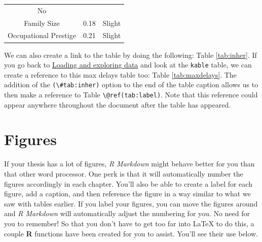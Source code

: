 \documentclass[12pt,twoside]{dukestatscithesis}
\theoremstyle{definition}
\theoremstyle{definition}
\theoremstyle{definition}
\theoremstyle{remark}
\begin{document}
\begin{longtable}[]{@{}ccc@{}}
\begin{minipage}[t]{0.16\columnwidth}
No\strut
\end{minipage}\tabularnewline
\begin{minipage}[t]{0.29\columnwidth}\centering\strut
Family Size\strut
\end{minipage} & \begin{minipage}[t]{0.47\columnwidth}\centering\strut
0.18\strut
\end{minipage} & \begin{minipage}[t]{0.16\columnwidth}\centering\strut
Slight\strut
\end{minipage}\tabularnewline
\begin{minipage}[t]{0.29\columnwidth}\centering\strut
Occupational Prestige\strut
\end{minipage} & \begin{minipage}[t]{0.47\columnwidth}\centering\strut
0.21\strut
\end{minipage} & \begin{minipage}[t]{0.16\columnwidth}\centering\strut
Slight\strut
\end{minipage}\tabularnewline
\bottomrule
\end{longtable}
We can also create a link to the table by doing the following: Table
\ref{tab:inher}. If you go back to
\protect\hyperlink{loading-and-exploring-data}{Loading and exploring
data} and look at the \texttt{kable} table, we can create a reference to
this max delays table too: Table \ref{tab:maxdelays}. The addition of
the \texttt{(\textbackslash{}\#tab:inher)} option to the end of the
table caption allows us to then make a reference to Table
\texttt{\textbackslash{}@ref(tab:label)}. Note that this reference could
appear anywhere throughout the document after the table has appeared.

\clearpage

\section{Figures}\label{figures}

If your thesis has a lot of figures, \emph{R Markdown} might behave
better for you than that other word processor. One perk is that it will
automatically number the figures accordingly in each chapter. You'll
also be able to create a label for each figure, add a caption, and then
reference the figure in a way similar to what we saw with tables
earlier. If you label your figures, you can move the figures around and
\emph{R Markdown} will automatically adjust the numbering for you. No
need for you to remember! So that you don't have to get too far into
LaTeX to do this, a couple \textbf{R} functions have been created for
you to assist. You'll see their use below.
\end{document}
